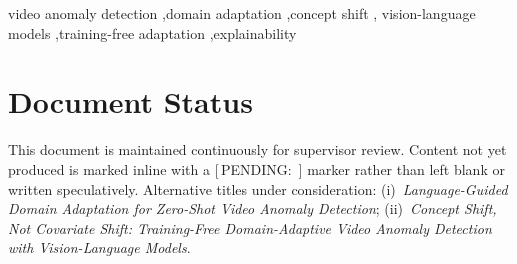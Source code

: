 \documentclass[a4paper,fleqn]{cas-sc}
\newcommand{\pending}[1]{{\sffamily\color{pendingcol}[\,PENDING: #1\,]}}
\newcommand{\wnote}[1]{{\color{notecol}#1}}
\begin{document}
\begin{keywords}
video anomaly detection \sep domain adaptation \sep concept shift \sep
vision-language models \sep training-free adaptation \sep explainability
\end{keywords}

\maketitle

\section*{Document Status}

\wnote{This document is maintained continuously for supervisor review. Content
not yet produced is marked inline with a \pending{} marker rather than left
blank or written speculatively. Alternative titles under consideration:
(i)~\emph{Language-Guided Domain Adaptation for Zero-Shot Video Anomaly
Detection}; (ii)~\emph{Concept Shift, Not Covariate Shift: Training-Free
Domain-Adaptive Video Anomaly Detection with Vision-Language Models}.}
\end{document}
